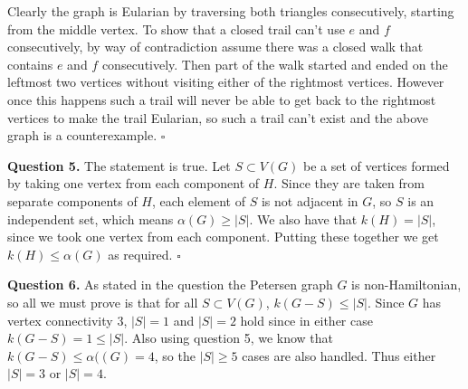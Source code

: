 \documentclass[letterpaper, reqno,11pt]{article}
\begin{document}
Clearly the graph is Eularian by traversing both triangles consecutively, starting from the middle vertex. To show that a closed trail can't use $e$ and $f$ consecutively, by way of contradiction assume there was a closed walk that contains $e$ and $f$ consecutively. Then part of the walk started and ended on the leftmost two vertices without visiting either of the rightmost vertices. However once this happens such a trail will never be able to get back to the rightmost vertices to make the trail Eularian, so such a trail can't exist and the above graph is a counterexample. $\square$



{\medskip\noindent\bf Question 5.} The statement is true. Let $S\subset V(G)$ be a set of vertices formed by taking one vertex from each component of $H$. Since they are taken from separate components of $H$, each element of $S$ is not adjacent in $G$, so $S$ is an independent set, which means $\alpha(G)\geq |S|$. We also have that $k(H)=|S|$, since we took one vertex from each component. Putting these together we get $k(H)\leq \alpha(G)$ as required. $\square$

{\medskip\noindent\bf Question 6.} As stated in the question the Petersen graph $G$ is non-Hamiltonian, so all we must prove is that for all $S\subset V(G)$, $k(G-S)\leq |S|$. Since $G$ has vertex connectivity $3$, $|S|=1$ and $|S|=2$ hold since in either case $k(G-S)=1\leq |S|$. Also using question 5, we know that $k(G-S)\leq \alpha((G)=4$, so the $|S|\geq 5$ cases are also handled. Thus either $|S|=3$ or $|S|=4$.
\end{document}
